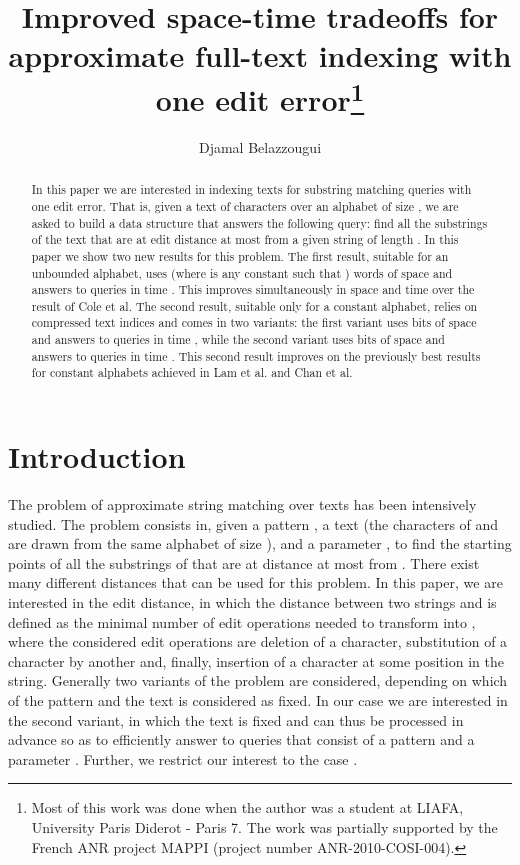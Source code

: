 \documentclass{article}
\newcommand{\?}{\mskip1.5mu}
\begin{document}
 
\sloppy
\title{Improved space-time tradeoffs for approximate full-text indexing with one edit error\thanks{Most of this work was done when the author was a student at LIAFA, University Paris Diderot - Paris 7. The work was partially supported by the French
 ANR project MAPPI (project number ANR-2010-COSI-004).}}
\author{Djamal Belazzougui}

\maketitle
\begin{abstract}
In this paper we are interested in indexing texts for substring matching queries with one edit error. That is, given a text  of 
 characters over an alphabet of size , we are asked to build a data structure that answers the following query:
find all the  substrings of the text that are at edit distance at most  from a given string  of length . In this paper we show two new results for this problem. The first result, suitable for an unbounded alphabet, uses  (where  is any constant such that ) words of space and answers to queries in time . This improves simultaneously in space and time over the result of Cole et al. The second result, suitable only for a constant alphabet, relies on compressed text indices and comes in two variants: the first variant uses  bits of space and answers to queries in time , while the second variant uses  bits of space and answers to queries in time . This second result improves on the previously best results for constant alphabets achieved in Lam et al. and Chan et al. 
\end{abstract}
\section{Introduction}
The problem of approximate string matching over texts has been intensively studied. The problem consists in, given a pattern , a text  (the characters of  and  are drawn from the same alphabet of size ), and a parameter , to find the starting points of all the substrings of  that are at distance at most  from . There exist many different distances that can be used for this problem. In this paper, we are interested in the edit distance, in which the distance between two strings  and  is defined as the minimal number of edit operations needed to transform  into , where the considered edit operations are deletion of a character, substitution of a character by another and, finally, insertion of a character at some position in the string. Generally two variants of the problem are considered, depending on which of the pattern and the text is considered as fixed. In our case we are interested in the second variant, in which the text is fixed and can thus be processed in advance so as to efficiently answer to queries that consist of a pattern and a parameter . Further, we restrict our interest to the case . 
\end{document}
